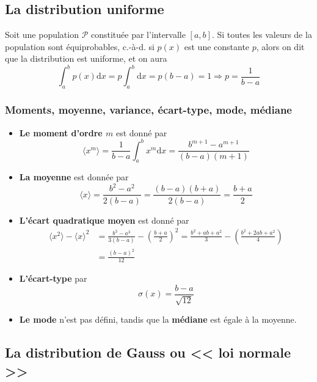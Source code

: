 \subsection{La distribution uniforme}

Soit une population $\mathcal{P}$ constituée par l'intervalle $[a,b]$. Si toutes les valeurs de la population sont équiprobables, c.-à-d. si $p(x)$ est une constante $p$, alors on dit que la distribution est uniforme, et on aura
\begin{equation}
\int_a^b p(x)\text{d}x=p\int_a^b\text{d}x=p(b-a)=1\Longrightarrow p=\frac{1}{b-a}
\end{equation}

\subsubsection{Moments, moyenne, variance, écart-type, mode, médiane}

\begin{itemize}
\item \textbf{Le moment d'ordre $m$} est donné par
\begin{equation}
\langle x^m\rangle=\frac{1}{b-a}\int_a^b x^m\text{d}x=
\frac{b^{m+1}-a^{m+1}}{(b-a)(m+1)}
\end{equation}
\item \textbf{La moyenne} est donnée par
\begin{equation}
\langle x\rangle=\frac{b^2-a^2}{2(b-a)}=\frac{(b-a)(b+a)}{2(b-a)}=\frac{b+a}{2}
\end{equation}
\item \textbf{L'écart quadratique moyen} est donné par
\begin{align}
\langle x^2\rangle-\langle x\rangle^2&=\frac{b^3-a^3}{3(b-a)}-\left(\frac{b+a}{2}\right)^2=\frac{b^2+ab+a^2}{3}-\left(\frac{b^2+2ab+a^2}{4}\right)\nonumber\\
&=\frac{(b-a)^2}{12}
\end{align}
\item \textbf{L'écart-type} par
\begin{equation}
\sigma(x)=\frac{b-a}{\sqrt{12}}
\end{equation}
\item \textbf{Le mode} n'est pas défini, tandis que la \textbf{médiane} est égale à la moyenne.
\end{itemize}

\subsection{La distribution de Gauss ou << loi normale >>}

